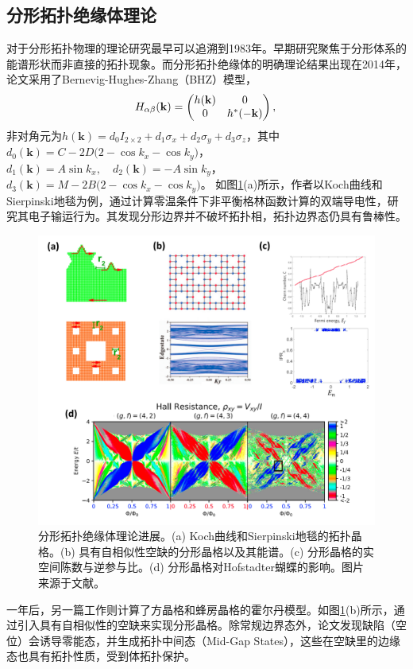 \subsection{分形拓扑绝缘体理论}
对于分形拓扑物理的理论研究最早可以追溯到1983年。早期研究聚焦于分形体系的能谱形状而非直接的拓扑现象\cite{alexander1984some,banavar1985energy}。而分形拓扑绝缘体的明确理论结果出现在2014年\cite{song2014topological}，论文采用了Bernevig-Hughes-Zhang（BHZ）模型，
\begin{equation}
    H_{\alpha \beta}(\mathbf{k}) = 
    \begin{pmatrix}
    h(\mathbf{k}) & 0 \\
    0 & h^*(-\mathbf{k})
    \end{pmatrix}, \\
\end{equation}
非对角元为$h(\mathbf{k}) = d_0 I_{2 \times 2} + d_1 \sigma_x + d_2 \sigma_y + d_3 \sigma_z$，其中$d_0(\mathbf{k}) = C - 2D \big( 2 - \cos k_x - \cos k_y \big)$，$d_1(\mathbf{k}) = A \sin k_x, \quad d_2(\mathbf{k}) = -A \sin k_y$，$d_3(\mathbf{k}) = M - 2B \big( 2 - \cos k_x - \cos k_y \big)$。
如图\ref{fig:TopoFractal}(a)所示，作者以Koch曲线和Sierpinski地毯为例，通过计算零温条件下非平衡格林函数计算的双端导电性，研究其电子输运行为。其发现分形边界并不破坏拓扑相，拓扑边界态仍具有鲁棒性。
\begin{figure}[htbp]
    \centering
    \includegraphics[width=0.6\linewidth]{figure/FractalTopo/TopoFractal.jpg}
    \caption{分形拓扑绝缘体理论进展。(a) Koch曲线和Sierpinski地毯的拓扑晶格。(b) 具有自相似性空缺的分形晶格以及其能谱。(c) 分形晶格的实空间陈数与逆参与比。(d) 分形晶格对Hofstadter蝴蝶的影响。图片来源于文献\cite{song2014topological,he2015topological,pai2019topological,fremling2020existence}。}
    \label{fig:TopoFractal}
\end{figure}
一年后，另一篇工作则计算了方晶格和蜂房晶格的霍尔丹模型\cite{he2015topological}。如图\ref{fig:TopoFractal}(b)所示，通过引入具有自相似性的空缺来实现分形晶格。除常规边界态外，论文发现缺陷（空位）会诱导零能态，并生成拓扑中间态（Mid-Gap States），这些在空缺里的边缘态也具有拓扑性质，受到体拓扑保护。

